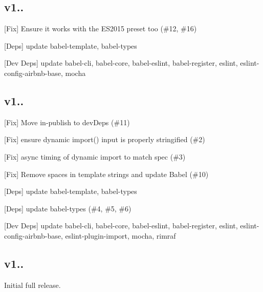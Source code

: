 \subsection*{v1..}


\begin{DoxyItemize}
\item \mbox{[}Fix\mbox{]} Ensure it works with the E\+S2015 preset too (\#12, \#16)
\item \mbox{[}Deps\mbox{]} update {\ttfamily babel-\/template}, {\ttfamily babel-\/types}
\item \mbox{[}Dev Deps\mbox{]} update {\ttfamily babel-\/cli}, {\ttfamily babel-\/core}, {\ttfamily babel-\/eslint}, {\ttfamily babel-\/register}, {\ttfamily eslint}, {\ttfamily eslint-\/config-\/airbnb-\/base}, {\ttfamily mocha}
\end{DoxyItemize}

\subsection*{v1..}


\begin{DoxyItemize}
\item \mbox{[}Fix\mbox{]} Move {\ttfamily in-\/publish} to dev\+Deps (\#11)
\item \mbox{[}Fix\mbox{]} ensure dynamic {\ttfamily import()} input is properly stringified (\#2)
\item \mbox{[}Fix\mbox{]} async timing of dynamic import to match spec (\#3)
\item \mbox{[}Fix\mbox{]} Remove spaces in template strings and update Babel (\#10)
\item \mbox{[}Deps\mbox{]} update {\ttfamily babel-\/template}, {\ttfamily babel-\/types}
\item \mbox{[}Deps\mbox{]} update {\ttfamily babel-\/types} (\#4, \#5, \#6)
\item \mbox{[}Dev Deps\mbox{]} update {\ttfamily babel-\/cli}, {\ttfamily babel-\/core}, {\ttfamily babel-\/eslint}, {\ttfamily babel-\/register}, {\ttfamily eslint}, {\ttfamily eslint-\/config-\/airbnb-\/base}, {\ttfamily eslint-\/plugin-\/import}, {\ttfamily mocha}, {\ttfamily rimraf}
\end{DoxyItemize}

\subsection*{v1..}


\begin{DoxyItemize}
\item Initial full release. 
\end{DoxyItemize}